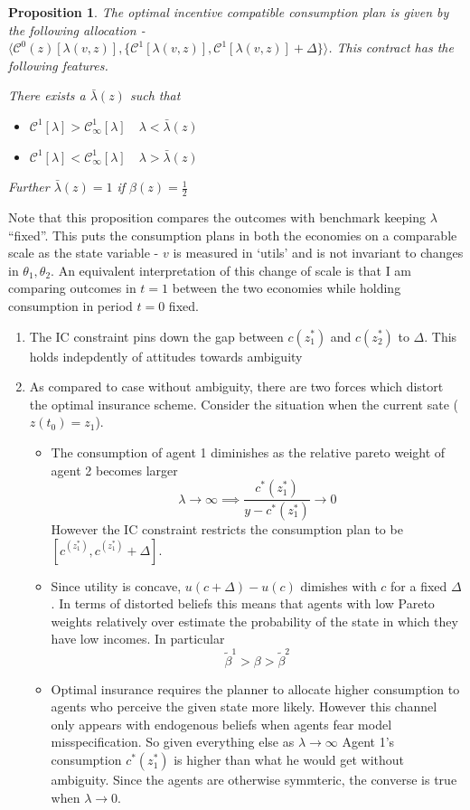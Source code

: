 \documentclass[12pt]{article}
\newtheorem{proposition}{Proposition}
\begin{document}
\begin{proposition}
The optimal incentive compatible consumption plan is given by the following allocation - $\langle \mathcal{C}^0(z)[\lambda(v,z)],\{\mathcal{C}^{1}[\lambda(v,z)],\mathcal{C}^{1}[\lambda(v,z)]+\Delta\}\rangle$. This contract has the following features.

There exists a $\bar{\lambda}(z)$ such that 
\begin{itemize}
	\item $\mathcal{C}^{1}[\lambda] > \mathcal{C}^{1}_{\infty}[\lambda] \quad \lambda < \bar{\lambda}(z)$
	\item $\mathcal{C}^{1}[\lambda] < \mathcal{C}^{1}_{\infty}[\lambda] \quad \lambda > \bar{\lambda}(z)$
\end{itemize}

Further $\bar{\lambda}(z)=1$ if $\beta(z)=\frac{1}{2}$
\end{proposition}
Note that this proposition compares the outcomes with benchmark keeping $\lambda$ ``fixed''. This puts the consumption plans in both the economies on a comparable scale as the state variable - $v$ is measured in `utils' and is not invariant to changes in $\theta_1,\theta_2$. An equivalent interpretation of this change of scale is that I am comparing outcomes in $t=1$ between the two economies while holding consumption in period $t=0$ fixed.  

\begin{enumerate}
	\item The IC constraint pins down the gap between $c(z^*_1)$ and $c(z^*_2)$ to $\Delta$. This holds indepdently of attitudes towards ambiguity
	\item As compared to case without ambiguity, there are two forces which distort the optimal insurance scheme. Consider the situation when the current sate ($z(t_0)=z_1$). 
	
\begin{itemize}
	\item The consumption of agent 1 diminishes as the relative pareto weight of agent 2 becomes larger
	\[\lambda \to \infty \implies \frac{c^*(z^*_1)}{y-c^*(z^*_1)} \to 0\]
	However the IC constraint restricts the consumption plan to be $[c^(z^*_1),c^(z^*_1)+\Delta]$. 
	
	\item Since utility is concave, $u(c+\Delta)-u(c)$ dimishes with  $c$  for a fixed $\Delta$. In terms of distorted beliefs this means that agents with low Pareto weights relatively over estimate the probability of the state in which they have low incomes. In particular
	\[\tilde{\beta}^1 > \beta > \tilde{\beta}^2\]
	\item Optimal insurance requires the planner to allocate higher consumption to agents who perceive the given state more likely. However this channel only appears with endogenous beliefs when agents fear model misspecification. So given everything else as $\lambda \to \infty $ Agent 1's consumption $c^*(z^*_1)$ is higher than what he would get without ambiguity. Since the agents are otherwise symmteric, the converse is true when $\lambda \to 0$. 
\end{itemize}
\end{enumerate}
\end{document}
